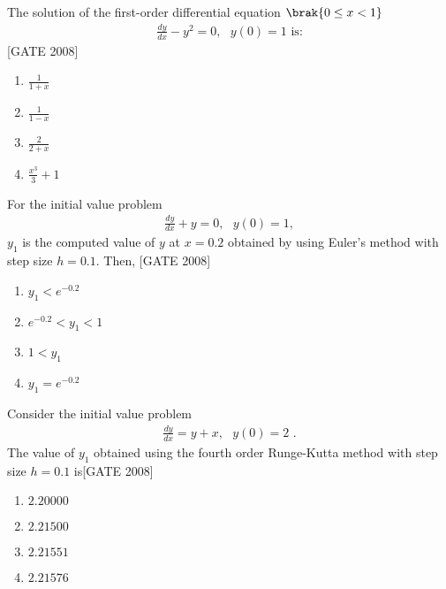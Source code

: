 \iffalse
\title{2008 XE}
\author{EE24BTECH11020 -  Ellanti Rohith}
\section{xe}
\chapter{2008}
\fi

\item The solution of the first-order differential equation $\brak{0 \leq x < 1}$
\begin{align*}
    \frac{dy}{dx} - y^2 = 0,\text{ } y(0) = 1 \text{ is:}
\end{align*} 
\hfill{[GATE 2008]}
\begin{multicols}{4}
\begin{enumerate}
    \item $\frac{1}{1 + x} $ 
    \item $ \frac{1}{1 - x} $
    \item $ \frac{2}{2 + x} $
\    \item $ \frac{x^3}{3} + 1 $
\end{enumerate}
\end{multicols}

\item For the initial value problem 
\begin{align*}
    \frac{dy}{dx} + y = 0 ,  \text{ }y(0) = 1 , 
\end{align*} $ y_1 $  is the computed value of $ y $ at $ x = 0.2 $ obtained by using Euler's method with step size $ h = 0.1 $. Then,
\hfill{[GATE 2008]}
\begin{multicols}{2}
    \begin{enumerate}
    \item $ y_1 < e^{-0.2} $
    \item $ e^{-0.2} < y_1 < 1 $
    \item $ 1 < y_1 $
    \item $ y_1 = e^{-0.2} $
\end{enumerate}
\end{multicols}


\item  Consider the initial value problem \begin{align*}
    \frac{dy}{dx} = y + x , \text{ }  y(0) = 2\text{ .} 
\end{align*}
The value of $ y_1 $ obtained using the fourth order Runge-Kutta method with step size $ h = 0.1 $ is\hfill{[GATE 2008]}
\begin{multicols}{4}
    \begin{enumerate}
    \item $ 2.20000 $
    \item $ 2.21500 $
    \item $ 2.21551 $
    \item $ 2.21576 $
\end{enumerate}
\end{multicols}


